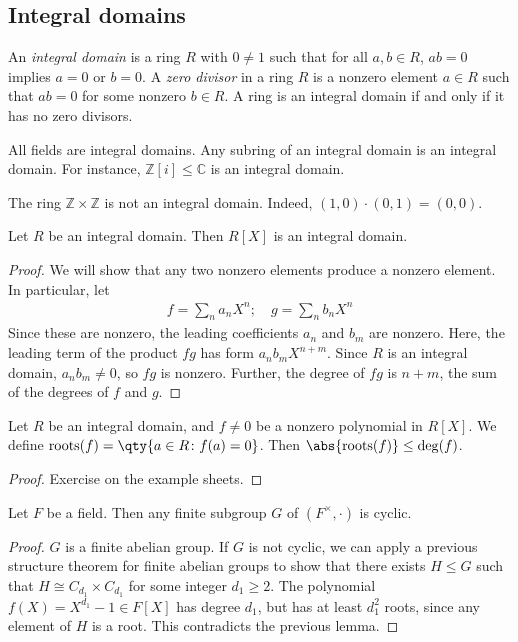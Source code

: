 \subsection{Integral domains}
\begin{definition}
	An \textit{integral domain} is a ring $R$ with $0 \neq 1$ such that for all $a, b \in R$, $a b = 0$ implies $a = 0$ or $b = 0$.
	A \textit{zero divisor} in a ring $R$ is a nonzero element $a \in R$ such that $a b = 0$ for some nonzero $b \in R$.
	A ring is an integral domain if and only if it has no zero divisors.
\end{definition}
\begin{example}
	All fields are integral domains.
	Any subring of an integral domain is an integral domain.
	For instance, $\mathbb Z[i] \leq \mathbb C$ is an integral domain.
\end{example}
\begin{example}
	The ring $\mathbb Z \times \mathbb Z$ is not an integral domain.
	Indeed, $(1,0) \cdot (0,1) = (0,0)$.
\end{example}
\begin{lemma}
	Let $R$ be an integral domain.
	Then $R[X]$ is an integral domain.
\end{lemma}
\begin{proof}
	We will show that any two nonzero elements produce a nonzero element.
	In particular, let
	\begin{align*}
		f = \sum_n a_n X^n;\quad g = \sum_n b_n X^n
	\end{align*}
	Since these are nonzero, the leading coefficients $a_n$ and $b_m$ are nonzero.
	Here, the leading term of the product $fg$ has form $a_n b_m X^{n+m}$.
	Since $R$ is an integral domain, $a_n b_m \neq 0$, so $fg$ is nonzero.
	Further, the degree of $fg$ is $n + m$, the sum of the degrees of $f$ and $g$.
\end{proof}
\begin{lemma}
	Let $R$ be an integral domain, and $f \neq 0$ be a nonzero polynomial in $R[X]$.
	We define $\mathrm{roots}(f) = \qty{a \in R \colon f(a) = 0}$.
	Then $\abs{\mathrm{roots}(f)} \leq \mathrm{deg}(f)$.
\end{lemma}
\begin{proof}
	Exercise on the example sheets.
\end{proof}
\begin{theorem}
	Let $F$ be a field.
	Then any finite subgroup $G$ of $(F^\times, \cdot)$ is cyclic.
\end{theorem}
\begin{proof}
	$G$ is a finite abelian group.
	If $G$ is not cyclic, we can apply a previous structure theorem for finite abelian groups to show that there exists $H \leq G$ such that $H \cong C_{d_1} \times C_{d_1}$ for some integer $d_1 \geq 2$.
	The polynomial $f(X) = X^{d_1} - 1 \in F[X]$ has degree $d_1$, but has at least $d_1^2$ roots, since any element of $H$ is a root.
	This contradicts the previous lemma.
\end{proof}
